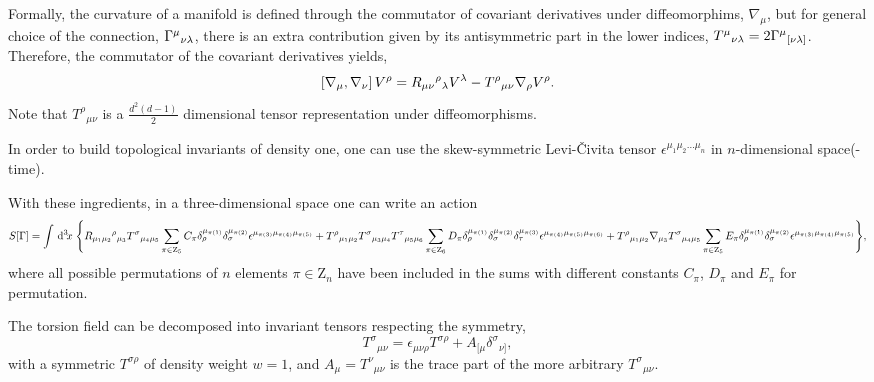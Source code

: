 \documentclass[twocolumn,
  showpacs,showkeys,prd,superscriptaddress]{revtex4-1}
\begin{document}
Formally, the curvature of a manifold is defined through the commutator of covariant derivatives under diffeomorphims, $\nabla_\mu$, but for general choice of the connection, $\Gamma^\mu{}_{\nu\lambda}$, there is an extra contribution given by its antisymmetric part in the lower indices, $T^\mu{}_{\nu\lambda}=2\Gamma^\mu{}_{[\nu\lambda]}$. Therefore, the commutator of the covariant derivatives yields,
\begin{equation}
  \left[\nabla_{{\mu}},\nabla_{{\nu}}\right]V^\rho = R_{\mu\nu}{}^\rho{}_\lambda V^\lambda - T^\rho{}_{\mu\nu}\nabla_{{\rho}}V^\rho.
  \label{curvdef}
\end{equation}
Note that $T^\rho{}_{\mu\nu}$ is a $\tfrac{d^2(d-1)}{2}$ dimensional tensor representation under diffeomorphisms.

In order to build topological invariants of density one, one can use the skew-symmetric Levi-\v{C}ivita tensor $\epsilon^{\mu_1\mu_2\dots\mu_n}$ in $n$-dimensional space(-time).

\begin{widetext}
  With these ingredients, in a three-dimensional space one can write an action 
  \begin{dmath}
    \label{accion3d}
    S[\Gamma] =
    \int \dn{3}{x}  \Bigg\{R_{\mu_1\mu_2}{}^\rho{}_{\mu_3} T^\sigma{}_{\mu_4\mu_5}\sum_{\pi \in  \mathrm{Z}_5}C_\pi\delta_\rho^{\mu_{\pi(1)}} \delta_\sigma^{\mu_{\pi(2)}}\epsilon^{\mu_{\pi(3)}\mu_{\pi(4)}\mu_{\pi(5)}}  + T^\rho{}_{\mu_1\mu_2} T^\sigma{}_{\mu_3\mu_4}T^\tau{}_{\mu_5\mu_6} \sum_{\pi \in \mathrm{Z}_6}D_\pi\delta_\rho^{\mu_{\pi(1)}} \delta_\sigma^{\mu_{\pi(2)}}\delta_\tau^{\mu_{\pi(3)}}\epsilon^{\mu_{\pi(4)}\mu_{\pi(5)}\mu_{\pi(6)}} + T^\rho{}_{\mu_1\mu_2}\nabla_{\mu_3} T^\sigma{}_{\mu_4\mu_5}\sum_{\pi \in \mathrm Z_5}E_\pi\delta_\rho^{\mu_{\pi(1)}} \delta_\sigma^{\mu_{\pi(2)}}\epsilon^{\mu_{\pi(3)}\mu_{\pi(4)}\mu_{\pi(5)}} \Bigg\}, 
  \end{dmath}
  where all possible permutations of $n$ elements $\pi\in\mathrm{Z}_n$ have been included in the sums with  different constants $C_\pi$, $D_\pi$ and $E_\pi$ for  permutation. 
\end{widetext}

The torsion field can be decomposed into invariant tensors respecting the symmetry,
\begin{equation}
  T^\sigma{}_{\mu\nu}=\epsilon_{\mu\nu\rho} T^{\sigma\rho}+A_{[\mu}\delta^\sigma{}_{\nu]},
\end{equation}
with a symmetric $T^{\sigma\rho}$ of density weight  $w =1$, and \mbox{$A_\mu=T^\nu{}_{\mu\nu}$} is the trace part of the more arbitrary $T^\sigma{}_{\mu\nu}$.
\end{document}
